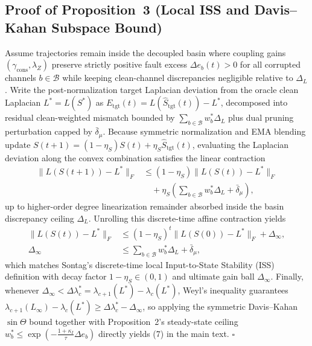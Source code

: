 \documentclass[journal]{IEEEtran}
\begin{document}
\subsection{Proof of Proposition~3 (Local ISS and Davis--Kahan Subspace Bound)}
Assume trajectories remain inside the decoupled basin where coupling gains $(\gamma_{\mathrm{cons}}, \lambda_Z)$ preserve strictly positive fault excess $\Delta e_b(t) > 0$ for all corrupted channels $b \in \mathcal{B}$ while keeping clean-channel discrepancies negligible relative to $\Delta_L$. Write the post-normalization target Laplacian deviation from the oracle clean Laplacian $L^* = L(S^*)$ as $E_{\mathrm{tgt}}(t) = L(\hat{S}_{\mathrm{tgt}}(t)) - L^*$, decomposed into residual clean-weighted mismatch bounded by $\sum_{b \in \mathcal{B}} w_b^* \Delta_L$ plus dual pruning perturbation capped by $\bar{\delta}_\mu$. Because symmetric normalization and EMA blending update $S(t+1) = (1-\eta_S) S(t) + \eta_S \hat{S}_{\mathrm{tgt}}(t)$, evaluating the Laplacian deviation along the convex combination satisfies the linear contraction
\begin{equation}
\begin{aligned}
\|L(S(t+1)) - L^*\|_F &\le (1-\eta_S)\|L(S(t)) - L^*\|_F \\
&\quad + \eta_S \left(\sum_{b\in\mathcal{B}} w_b^* \Delta_L + \bar{\delta}_\mu\right),
\end{aligned}
\end{equation}
up to higher-order degree linearization remainder absorbed inside the basin discrepancy ceiling $\Delta_L$. Unrolling this discrete-time affine contraction yields
\begin{equation}
\begin{aligned}
\|L(S(t)) - L^*\|_F &\le (1-\eta_S)^t \|L(S(0)) - L^*\|_F + \Delta_\infty, \\
\Delta_\infty &\le \sum_{b\in\mathcal{B}} w_b^* \Delta_L + \bar{\delta}_\mu,
\end{aligned}
\end{equation}
which matches Sontag's discrete-time local Input-to-State Stability (ISS) definition with decay factor $1 - \eta_S \in (0, 1)$ and ultimate gain ball $\Delta_\infty$. Finally, whenever $\Delta_\infty < \Delta\lambda_c^* = \lambda_{c+1}(L^*) - \lambda_c(L^*)$, Weyl's inequality guarantees $\lambda_{c+1}(L_\infty) - \lambda_c(L^*) \ge \Delta\lambda_c^* - \Delta_\infty$, so applying the symmetric Davis--Kahan $\sin\Theta$ bound together with Proposition~2's steady-state ceiling $w_b^* \le \exp(-\frac{1+\kappa_I}{\tau}\Delta e_b)$ directly yields (7) in the main text. $\square$
\end{document}
